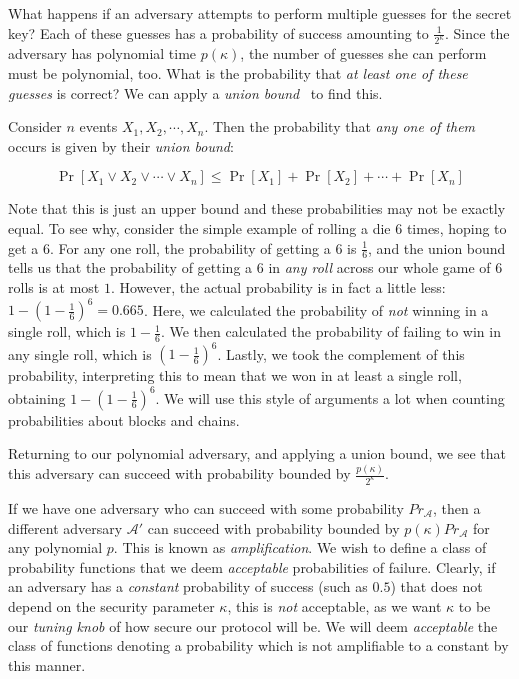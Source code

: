 What happens if an adversary attempts to perform multiple guesses for the secret key?
Each of these guesses has a probability of success amounting to $\frac{1}{2^\kappa}$.
Since the adversary has polynomial time $p(\kappa)$, the number of guesses she can
perform must be polynomial, too. What is the probability that \emph{at least one of
these guesses} is correct? We can apply a \emph{union bound}~\cite{ross} to find this.

\begin{theorem}
  Consider $n$ events $X_1, X_2, \cdots, X_n$. Then the probability
  that \emph{any one of them} occurs is given by their \emph{union bound}:

  \[
    \Pr[X_1 \lor X_2 \lor \cdots \lor X_n] \leq \Pr[X_1] + \Pr[X_2] + \cdots + \Pr[X_n]
  \]
\end{theorem}


Note that this is just an upper bound and these probabilities may not be exactly
equal. To see why, consider the simple example of rolling a die $6$ times, hoping
to get a $6$. For any one roll, the probability of getting a $6$ is $\frac{1}{6}$,
and the union bound tells us that the probability of getting a $6$ in \emph{any
roll} across our whole game of $6$ rolls is at most $1$. However, the actual probability
is in fact a little less: $1 - (1 - \frac{1}{6})^6 = 0.665$. Here, we calculated
the probability of \emph{not} winning in a single roll, which is $1 - \frac{1}{6}$.
We then calculated the probability of failing to win in any single roll, which is
$(1 - \frac{1}{6})^6$. Lastly, we took the complement of this probability, interpreting
this to mean that we won in at least a single roll, obtaining $1 - (1 - \frac{1}{6})^6$.
We will use this style of arguments a lot when counting probabilities about blocks
and chains.

Returning to our polynomial adversary, and applying a union bound, we see that
this adversary can succeed with probability bounded by $\frac{p(\kappa)}{2^\kappa}$.

If we have one adversary who can succeed with some probability $Pr_\mathcal{A}$,
then a different adversary $\mathcal{A}'$ can succeed with probability
bounded by $p(\kappa) Pr_{\mathcal{A}}$ for any polynomial $p$. This is known as
\emph{amplification}.
We wish to define a class of probability functions that we deem \emph{acceptable}
probabilities of failure. Clearly, if an adversary has a \emph{constant} probability of success
(such as $0.5$) that does not depend on the security parameter $\kappa$, this is \emph{not}
acceptable, as we want $\kappa$ to be our \emph{tuning knob} of how secure our protocol will be.
We will deem \emph{acceptable} the class of functions denoting a probability which is not
amplifiable to a constant by this manner.


